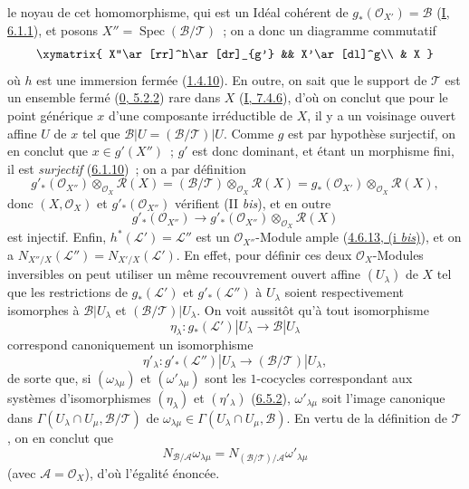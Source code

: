 
le noyau de cet homomorphisme, qui est un Idéal cohérent de
$g_*(\mathcal{O}_{X'})=\mathcal{B}$
(\hyperref[I.6.1.1-fr]{I, 6.1.1}), et posons
$X''=\operatorname{Spec}(\mathcal{B}/\mathcal{T})$~; on a donc un diagramme
commutatif
\[
\xymatrix{
X''\ar[rr]^h\ar[dr]_{g'} && X'\ar[dl]^g\\
& X
}
\]
où $h$ est une immersion fermée (\hyperref[II.1.4.10-fr]{1.4.10}). En outre,
on sait que le support de $\mathcal{T}$ est un ensemble fermé
(\hyperref[0.5.2.2-fr]{0, 5.2.2}) rare dans $X$
(\hyperref[I.7.4.6-fr]{I, 7.4.6}), d'où on conclut que pour le point générique
$x$ d'une composante irréductible de $X$, il y a un voisinage ouvert affine
$U$ de $x$ tel que
$\mathcal{B}|U=(\mathcal{B}/\mathcal{T})|U$. Comme $g$ est par hypothèse
surjectif, on en conclut que $x\in g'(X'')$~; $g'$ est donc dominant, et étant
un morphisme fini, il est \emph{surjectif}
(\hyperref[II.6.1.10-fr]{6.1.10})~; on a par définition
\[
g'_*(\mathcal{O}_{X''})\otimes_{\mathcal{O}_X}\mathcal{R}(X)
=(\mathcal{B}/\mathcal{T})\otimes_{\mathcal{O}_X}\mathcal{R}(X)
=g_*(\mathcal{O}_{X'})\otimes_{\mathcal{O}_X}\mathcal{R}(X),
\]
donc $(X,\mathcal{O}_X)$ et $g'_*(\mathcal{O}_{X''})$ vérifient
(II \emph{bis}), et en outre
\[
g'_*(\mathcal{O}_{X''})\longrightarrow
g'_*(\mathcal{O}_{X''})\otimes_{\mathcal{O}_X}\mathcal{R}(X)
\]
est injectif. Enfin, $h^*(\mathcal{L}')=\mathcal{L}''$ est un
$\mathcal{O}_{X''}$-Module ample
(\hyperref[II.4.6.13-fr]{4.6.13, (i \emph{bis})}), et on a
$N_{X''/X}(\mathcal{L}'')=N_{X'/X}(\mathcal{L}')$. En effet, pour définir
ces deux $\mathcal{O}_X$-Modules inversibles on peut utiliser un même
recouvrement ouvert affine $(U_\lambda)$ de $X$ tel que les restrictions de
$g_*(\mathcal{L}')$ et $g'_*(\mathcal{L}'')$ à $U_\lambda$ soient
respectivement isomorphes à $\mathcal{B}|U_\lambda$ et
$(\mathcal{B}/\mathcal{T})|U_\lambda$. On voit aussitôt qu'à tout
isomorphisme
\[
\eta_\lambda:g_*(\mathcal{L}')|U_\lambda\longrightarrow
\mathcal{B}|U_\lambda
\]
correspond canoniquement un isomorphisme
\[
\eta'_\lambda:g'_*(\mathcal{L}'')|U_\lambda\longrightarrow
(\mathcal{B}/\mathcal{T})|U_\lambda,
\]
de sorte que, si $(\omega_{\lambda\mu})$ et
$(\omega'_{\lambda\mu})$ sont les $1$-cocycles correspondant aux systèmes
d'isomorphismes $(\eta_\lambda)$ et $(\eta'_\lambda)$
(\hyperref[II.6.5.2-fr]{6.5.2}), $\omega'_{\lambda\mu}$ soit l'image
canonique dans
$\Gamma(U_\lambda\cap U_\mu,\mathcal{B}/\mathcal{T})$ de
$\omega_{\lambda\mu}\in\Gamma(U_\lambda\cap U_\mu,\mathcal{B})$. En vertu
de la définition de $\mathcal{T}$, on en conclut que
\[
N_{\mathcal{B}/\mathcal{A}}\omega_{\lambda\mu}
=N_{(\mathcal{B}/\mathcal{T})/\mathcal{A}}\omega'_{\lambda\mu}
\]
(avec $\mathcal{A}=\mathcal{O}_X$), d'où l'égalité énoncée.

